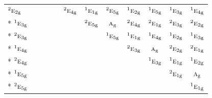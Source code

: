 \documentclass[10pt,a4paper]{article}
\numberwithin{equation}{section}
\newcommand{\irr}[1]{\text{\normalfont\scshape #1}}
\newcommand{\conjpair}[1]{{}^{#1}}
\newcommand{\ptag}[1]{\mathrm{#1}}
\begin{document}
{\begin{longtable}{@{}lccccccccccc@{}}
$\conjpair{2}\irr{e}_{2\ptag{g}}$ &  &  &  &  & $\conjpair{2}\irr{e}_{4\ptag{g}}$ & $\conjpair{1}\irr{e}_{1\ptag{g}}$ & $\conjpair{2}\irr{e}_{5\ptag{g}}$ & $\conjpair{1}\irr{e}_{2\ptag{g}}$ & $\conjpair{1}\irr{e}_{5\ptag{g}}$ & $\conjpair{1}\irr{e}_{3\ptag{g}}$ & $\conjpair{1}\irr{e}_{4\ptag{g}}$\\*
$\conjpair{1}\irr{e}_{3\ptag{g}}$ &  &  &  &  &  & $\conjpair{2}\irr{e}_{5\ptag{g}}$ & $\irr{a}_{\ptag{g}}$ & $\conjpair{2}\irr{e}_{4\ptag{g}}$ & $\conjpair{2}\irr{e}_{1\ptag{g}}$ & $\conjpair{2}\irr{e}_{3\ptag{g}}$ & $\conjpair{2}\irr{e}_{2\ptag{g}}$\\*
$\conjpair{2}\irr{e}_{3\ptag{g}}$ &  &  &  &  &  &  & $\conjpair{1}\irr{e}_{5\ptag{g}}$ & $\conjpair{1}\irr{e}_{1\ptag{g}}$ & $\conjpair{1}\irr{e}_{4\ptag{g}}$ & $\conjpair{1}\irr{e}_{2\ptag{g}}$ & $\conjpair{1}\irr{e}_{3\ptag{g}}$\\*
$\conjpair{1}\irr{e}_{4\ptag{g}}$ &  &  &  &  &  &  &  & $\conjpair{2}\irr{e}_{3\ptag{g}}$ & $\irr{a}_{\ptag{g}}$ & $\conjpair{2}\irr{e}_{2\ptag{g}}$ & $\conjpair{2}\irr{e}_{1\ptag{g}}$\\*
$\conjpair{2}\irr{e}_{4\ptag{g}}$ &  &  &  &  &  &  &  &  & $\conjpair{1}\irr{e}_{3\ptag{g}}$ & $\conjpair{1}\irr{e}_{1\ptag{g}}$ & $\conjpair{1}\irr{e}_{2\ptag{g}}$\\*
$\conjpair{1}\irr{e}_{5\ptag{g}}$ &  &  &  &  &  &  &  &  &  & $\conjpair{2}\irr{e}_{1\ptag{g}}$ & $\irr{a}_{\ptag{g}}$\\*
$\conjpair{2}\irr{e}_{5\ptag{g}}$ &  &  &  &  &  &  &  &  &  &  & $\conjpair{1}\irr{e}_{1\ptag{g}}$\\
\bottomrule\end{longtable}}
\end{document}
